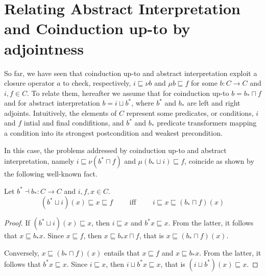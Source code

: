 \documentclass{llncs}
\begin{document}
\section{Relating Abstract Interpretation and Coinduction up-to by adjointness}
So far, we have seen that coinduction up-to and abstract interpretation exploit a closure operator $a$ to check, respectively,  $i \sqsubseteq \nu b$ and $\mu b \sqsubseteq f$ for some $b\colon C \to C$ and $i,f \in C$. To relate them, hereafter we assume that for coinduction up-to $b= b_* \sqcap f$ and for abstract interpretation $b=i \sqcup b^*$, where $b^*$ and $b_*$ are left and right adjoints. Intuitively, the elements of $C$ represent some predicates, or conditions, $i$ and $f$ intial and final condifitions, and $b^*$ and $b_*$ predicate transformers mapping a condition into its strongest postcondition and weakest precondition.


In this case, the problems addressed by coinduction up-to and abstract interpretation, namely $i \sqsubseteq \nu (b^* \sqcap f)$ and $\mu (b_*\sqcup i) \sqsubseteq f$, coincide as shown by the following well-known fact.

%
%
%
\begin{proposition}\label{prop:correspondencefixedpoints}Let $b^* \dashv b_* \colon C \to C$ and $i,f,x\in C$. 
$$(b^*\sqcup i)(x) \sqsubseteq x \sqsubseteq f \qquad \text{ iff } \qquad 
i \sqsubseteq x \sqsubseteq (b_*\sqcap f) (x)$$
\end{proposition}
\begin{proof}
If $(b^*\sqcup i)(x) \sqsubseteq x$, then $ i \sqsubseteq x$ and $b^*x\sqsubseteq x$. From the latter, it follows that $x\sqsubseteq b_* x$. 
%
Since $x\sqsubseteq f$, then  $x\sqsubseteq b_* x \sqcap f$, that is $x\sqsubseteq (b_* \sqcap f)(x)$.

Conversely, $x \sqsubseteq (b_*\sqcap f)(x)$ entails that $x\sqsubseteq f$ and $x \sqsubseteq b_*x$. From the latter, it follows that $b^*x\sqsubseteq x$. 
%
Since $i\sqsubseteq x$, then $i\sqcup b^*x \sqsubseteq x$, that is $(i \sqcup b^*)(x) \sqsubseteq x$.
\end{proof}
\end{document}
